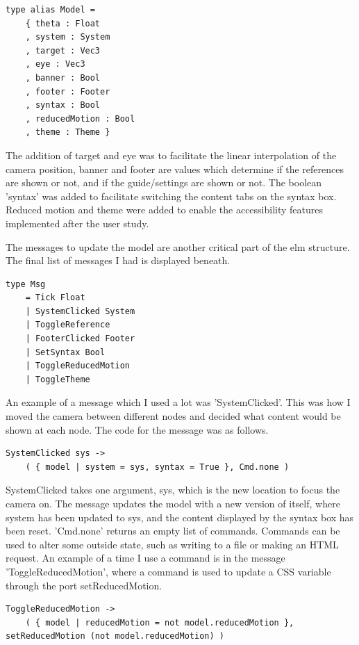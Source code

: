 \documentclass{l4proj}
\begin{document}
\begin{lstlisting}
type alias Model =
    { theta : Float
    , system : System
    , target : Vec3
    , eye : Vec3
    , banner : Bool
    , footer : Footer
    , syntax : Bool
    , reducedMotion : Bool
    , theme : Theme }
\end{lstlisting}

The addition of target and eye was to facilitate the linear interpolation of the camera position, banner and footer are values which determine if the references are shown or not, and if the guide/settings are shown or not.  The boolean 'syntax' was added to facilitate switching the content tabs on the syntax box.  Reduced motion and theme were added to enable the accessibility features implemented after the user study.

The messages to update the model are another critical part of the elm structure. The final list of messages I had is displayed beneath.

\begin{lstlisting}
type Msg
    = Tick Float
    | SystemClicked System
    | ToggleReference
    | FooterClicked Footer
    | SetSyntax Bool
    | ToggleReducedMotion
    | ToggleTheme
\end{lstlisting}

An example of a message which I used a lot was 'SystemClicked'.  This was how I moved the camera between different nodes and decided what content would be shown at each node.  The code for the message was as follows.

\begin{lstlisting}
SystemClicked sys ->
    ( { model | system = sys, syntax = True }, Cmd.none )
\end{lstlisting}

SystemClicked takes one argument, sys, which is the new location to focus the camera on.  The message updates the model with a new version of itself, where system has been updated to sys, and the content displayed by the syntax box has been reset.  'Cmd.none' returns an empty list of commands.  Commands can be used to alter some outside state, such as writing to a file or making an HTML request.  An example of a time I use a command is in the message 'ToggleReducedMotion', where a command is used to update a CSS variable through the port setReducedMotion.

\begin{lstlisting}
ToggleReducedMotion ->
    ( { model | reducedMotion = not model.reducedMotion }, setReducedMotion (not model.reducedMotion) )
\end{lstlisting}
\end{document}
